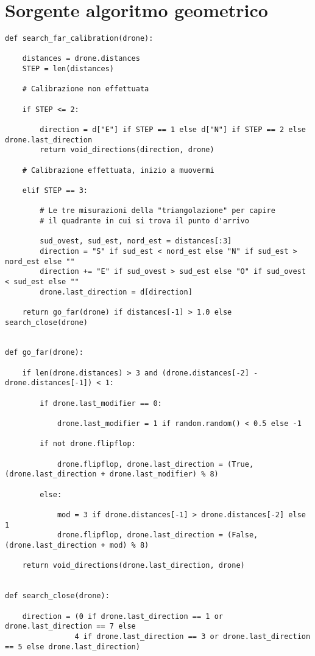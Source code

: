 \section{Sorgente algoritmo geometrico}
\begin{verbatim}
def search_far_calibration(drone):

    distances = drone.distances
    STEP = len(distances)

    # Calibrazione non effettuata

    if STEP <= 2:

        direction = d["E"] if STEP == 1 else d["N"] if STEP == 2 else drone.last_direction
        return void_directions(direction, drone)

    # Calibrazione effettuata, inizio a muovermi

    elif STEP == 3:

        # Le tre misurazioni della "triangolazione" per capire
        # il quadrante in cui si trova il punto d'arrivo

        sud_ovest, sud_est, nord_est = distances[:3]
        direction = "S" if sud_est < nord_est else "N" if sud_est > nord_est else ""
        direction += "E" if sud_ovest > sud_est else "O" if sud_ovest < sud_est else ""
        drone.last_direction = d[direction]

    return go_far(drone) if distances[-1] > 1.0 else search_close(drone)


def go_far(drone):

    if len(drone.distances) > 3 and (drone.distances[-2] - drone.distances[-1]) < 1:

        if drone.last_modifier == 0:

            drone.last_modifier = 1 if random.random() < 0.5 else -1

        if not drone.flipflop:

            drone.flipflop, drone.last_direction = (True, (drone.last_direction + drone.last_modifier) % 8)

        else:

            mod = 3 if drone.distances[-1] > drone.distances[-2] else 1
            drone.flipflop, drone.last_direction = (False, (drone.last_direction + mod) % 8)

    return void_directions(drone.last_direction, drone)


def search_close(drone):

    direction = (0 if drone.last_direction == 1 or drone.last_direction == 7 else
                4 if drone.last_direction == 3 or drone.last_direction == 5 else drone.last_direction)


\end{verbatim}
